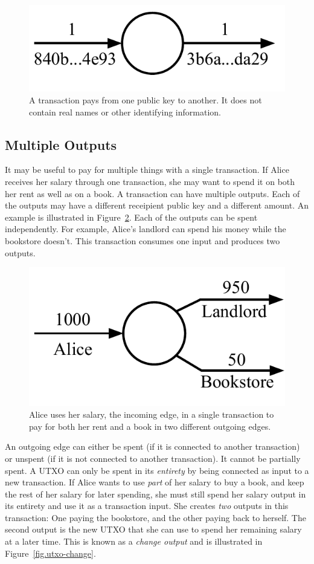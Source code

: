 \begin{figure}[h]
    \centering
    \includegraphics[width=0.35 \columnwidth,keepaspectratio]{figures/utxo-transaction-keys.pdf}
    \caption{A transaction pays from one public key to another. It does not contain real names
             or other identifying information.}
    \label{fig.utxo-transaction-keys}
\end{figure}

\subsection*{Multiple Outputs}

It may be useful to pay for multiple things with a single transaction. If Alice receives
her salary through one transaction, she may want to spend it on both her rent as well
as on a book. A transaction can have multiple outputs. Each of the outputs may have a
different receipient public key and a different amount. An example is illustrated in
Figure~\ref{fig.utxo-multiple-outputs}. Each of the outputs can be spent independently.
For example, Alice's landlord can spend his money while the bookstore doesn't. This
transaction consumes one input and produces two outputs.

\begin{figure}[h]
    \centering
    \includegraphics[width=0.35 \columnwidth,keepaspectratio]{figures/utxo-multiple-outputs.pdf}
    \caption{Alice uses her salary, the incoming edge, in a single transaction to pay for
             both her rent and a book in two different outgoing edges.}
    \label{fig.utxo-multiple-outputs}
\end{figure}

An outgoing edge can either be spent (if it is connected to another transaction) or
unspent (if it is not connected to another transaction). It cannot be partially spent.
A UTXO can only be spent in its \emph{entirety} by being connected as input to a new
transaction. If Alice wants to use \emph{part} of her salary to buy a book, and keep
the rest of her salary for later spending, she must still spend her salary output
in its entirety and use it as a transaction input. She creates \emph{two} outputs
in this transaction: One paying the bookstore, and the other paying back to herself.
The second output is the new UTXO that she can use to spend her remaining salary
at a later time. This is known as a \emph{change output} and is
illustrated in Figure~\ref{fig.utxo-change}.

